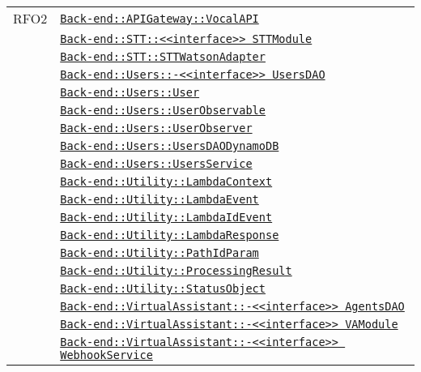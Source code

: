 \begin{longtable}{|>{\centering}m{3cm}|m{10cm}<{\centering}|}
RFO2 & \hyperref[Back-end::APIGateway::VocalAPI]{\texttt{Back-end::APIGateway::VocalAPI}}\\
& \hyperref[Back-end::STT::<<interface>> STTModule]{\texttt{Back-end::STT::<<interface>> STTModule}}\\
& \hyperref[Back-end::STT::STTWatsonAdapter]{\texttt{Back-end::STT::STTWatsonAdapter}}\\
& \hyperref[Back-end::Users::<<interface>> UsersDAO]{\texttt{Back-end::Users::-\linebreak <<interface>> UsersDAO}}\\
& \hyperref[Back-end::Users::User]{\texttt{Back-end::Users::User}}\\
& \hyperref[Back-end::Users::UserObservable]{\texttt{Back-end::Users::UserObservable}}\\
& \hyperref[Back-end::Users::UserObserver]{\texttt{Back-end::Users::UserObserver}}\\
& \hyperref[Back-end::Users::UsersDAODynamoDB]{\texttt{Back-end::Users::UsersDAODynamoDB}}\\
& \hyperref[Back-end::Users::UsersService]{\texttt{Back-end::Users::UsersService}}\\
& \hyperref[Back-end::Utility::LambdaContext]{\texttt{Back-end::Utility::LambdaContext}}\\
& \hyperref[Back-end::Utility::LambdaEvent]{\texttt{Back-end::Utility::LambdaEvent}}\\
& \hyperref[Back-end::Utility::LambdaIdEvent]{\texttt{Back-end::Utility::LambdaIdEvent}}\\
& \hyperref[Back-end::Utility::LambdaResponse]{\texttt{Back-end::Utility::LambdaResponse}}\\
& \hyperref[Back-end::Utility::PathIdParam]{\texttt{Back-end::Utility::PathIdParam}}\\
& \hyperref[Back-end::Utility::ProcessingResult]{\texttt{Back-end::Utility::ProcessingResult}}\\
& \hyperref[Back-end::Utility::StatusObject]{\texttt{Back-end::Utility::StatusObject}}\\
& \hyperref[Back-end::VirtualAssistant::<<interface>> AgentsDAO]{\texttt{Back-end::VirtualAssistant::-\linebreak <<interface>> AgentsDAO}}\\
& \hyperref[Back-end::VirtualAssistant::<<interface>> VAModule]{\texttt{Back-end::VirtualAssistant::-\linebreak <<interface>> VAModule}}\\
& \hyperref[Back-end::VirtualAssistant::<<interface>> WebhookService]{\texttt{Back-end::VirtualAssistant::-\linebreak <<interface>> WebhookService}}\\

\end{longtable}
